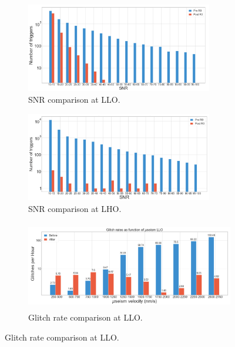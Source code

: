 \documentclass[12pt]{iopart}
\begin{document}
\par
\begin{figure}[h]
\captionsetup[subfigure]{font=scriptsize,labelfont=scriptsize}
   \centering
    \begin{subfigure}[b]{0.45\textwidth}
        \centering
         \includegraphics[width= \textwidth,height=3.9cm]{snr_preandpostLLO.png}
         \caption{SNR comparison at LLO.}
         \label{fig:snr_r0LLO}
    \end{subfigure}
    \hfill
    \begin{subfigure}[b]{0.45\textwidth}
        \centering
         \includegraphics[width =\textwidth,height=3.9cm]{snr_preandpostLHO.png}
         \caption{SNR comparison  at LHO.}
         \label{fig:snr_r0LHO}
    \end{subfigure}
    \par\bigskip
    \begin{subfigure}[b]{0.45\textwidth}
        \centering
         \includegraphics[width= \textwidth,height=3.9cm]{glitch_rateLLO.png}
         \caption{Glitch rate comparison at LLO.}
         

\end{subfigure}
\end{figure}
\end{document}
